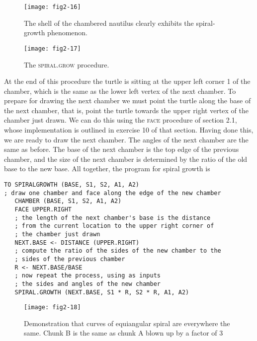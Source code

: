 \documentclass{book}
\begin{document}
\begin{figure}
\begin{center}
\texttt{[image: fig2-16]}
\caption{The shell of the chambered nautilus clearly exhibits the spiral-growth phenomenon.}
\end{center}
\end{figure}

\begin{figure}
\begin{center}
\texttt{[image: fig2-17]}
\caption{The \textsc{spiral}\textsc{.grow} procedure.}
\end{center}
\end{figure}

At the end of this procedure the turtle is sitting at the upper left corner
1 of the chamber, which is the same as the lower left vertex of the next
chamber. To prepare for drawing the next chamber we must point the
turtle along the base of the next chamber, that is, point the turtle
towards the upper right vertex of the chamber just drawn. We can do
this using the \textsc{face} procedure of section 2.1, whose implementation is
outlined in exercise 10 of that section. Having done this, we are ready
to draw the next chamber. The angles of the next chamber are the same
as before. The base of the next chamber is the top edge of the previous
chamber, and the size of the next chamber is determined by the ratio
of the old base to the new base. All together, the program for spiral
growth is

\begin{verbatim}
TO SPIRALGROWTH (BASE, S1, S2, A1, A2)
; draw one chamber and face along the edge of the new chamber
   CHAMBER (BASE, S1, S2, A1, A2)
   FACE UPPER.RIGHT
   ; the length of the next chamber's base is the distance
   ; from the current location to the upper right corner of
   ; the chamber just drawn
   NEXT.BASE <- DISTANCE (UPPER.RIGHT)
   ; compute the ratio of the sides of the new chamber to the
   ; sides of the previous chamber
   R <- NEXT.BASE/BASE
   ; now repeat the process, using as inputs
   ; the sides and angles of the new chamber
   SPIRAL.GROWTH (NEXT.BASE, S1 * R, S2 * R, A1, A2)
\end{verbatim}
\begin{figure}
\begin{center}
\texttt{[image: fig2-18]}
\caption{Demonstration that curves of equiangular spiral are everywhere the same. Chunk B is the same as chunk A blown up by a factor of 3}
\end{center}
\end{figure}
\end{document}
